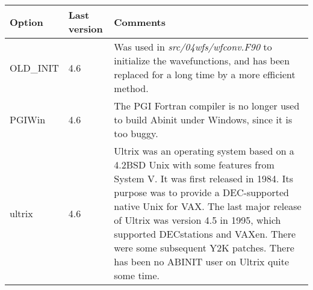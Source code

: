 \begin{center}
\begin{tabular}{|l|l|p{9cm}|}
\hline 
\textbf{Option}  & \textbf{Last version}  & \textbf{Comments} \tabularnewline
\hline 
OLD\_INIT  & 4.6  & Was used in \textit{src/04wfs/wfconv.F90} to initialize the wavefunctions,
and has been replaced for a long time by a more efficient method. \tabularnewline
\hline 
PGIWin  & 4.6  & The PGI Fortran compiler is no longer used to build Abinit under Windows,
since it is too buggy. \tabularnewline
\hline 
ultrix  & 4.6  & Ultrix was an operating system based on a 4.2BSD Unix with some features
from System V. It was first released in 1984. Its purpose was to provide
a DEC-supported native Unix for VAX. The last major release of Ultrix
was version 4.5 in 1995, which supported DECstations and VAXen. There
were some subsequent Y2K patches. There has been no ABINIT user on
Ultrix quite some time. \tabularnewline
\hline
\end{tabular}
\par\end{center}

